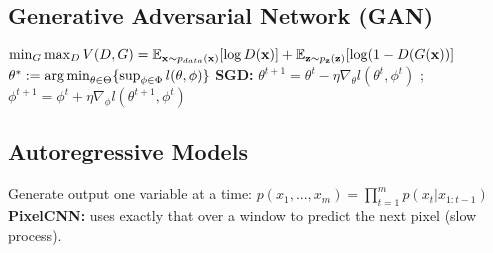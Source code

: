 \subsection*{Generative Adversarial Network (GAN)}
$\min_G \max_D V(D,G) = \mathbb{E}_{\mathbf{x}\sim p_{data}(\mathbf{x})}[\log D(\mathbf{x}) ] + \mathbb{E}_{\mathbf{z}\sim p_{\mathbf{z}}(\mathbf{\mathbf{z}})}[\log (1 - D(G(\mathbf{x})) ] \\
$ $\theta^* := \operatorname*{arg\,min}_{\theta\in \Theta} \{ \sup_{\phi \in \Phi} l(\theta, \phi)\}$
\textbf{SGD:}  $\theta^{t+1} = \theta^t - \eta \nabla_\theta l(\theta^t, \phi^t)$ ; $\phi^{t+1} = \phi^t + \eta \nabla_\phi l(\theta^{t+1}, \phi^t)$ 
\subsection*{Autoregressive Models}
Generate output one variable at a time: $p(x_1, ..., x_m) = \prod_{t=1}^m p(x_t|x_{1:t-1})$ \\\textbf{PixelCNN:} uses exactly that over a window to predict the next pixel (slow process).